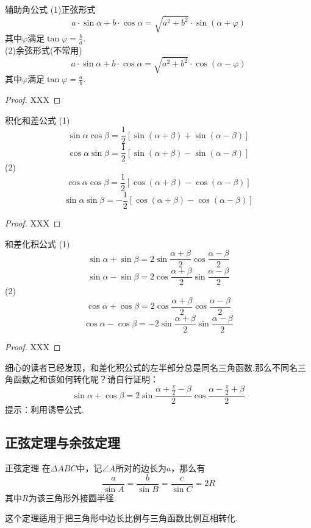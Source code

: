 \documentclass[lang=cn, zihao=5]{elegantbook}
\begin{document}
\begin{proposition}{辅助角公式}
    (1)正弦形式$$a \cdot \sin{\alpha} + b \cdot \cos{\alpha} = \sqrt{a^2+b^2} \cdot \sin{(\alpha + \varphi)}$$
    其中$\varphi$满足$\tan{\varphi}=\frac{b}{a}$.\\
    (2)余弦形式(不常用)$$a \cdot \sin{\alpha} + b \cdot \cos{\alpha} = \sqrt{a^2+b^2} \cdot \cos{(\alpha - \varphi)}$$
    其中$\varphi$满足$\tan{\varphi}=\frac{a}{b}$.
\end{proposition}
\begin{proof}
    XXX
\end{proof}

\begin{proposition}{积化和差公式} %
    (1)$$\sin{\alpha}\cos{\beta}=\frac{1}{2}[\sin{(\alpha+\beta)}+\sin{(\alpha-\beta)}]$$
    $$\cos{\alpha}\sin{\beta}=\frac{1}{2}[\sin{(\alpha+\beta)}-\sin{(\alpha-\beta)}]$$
    (2)$$\cos{\alpha}\cos{\beta}=\frac{1}{2}[\cos{(\alpha+\beta)}-\cos{(\alpha-\beta)}]$$
    $$\sin{\alpha}\sin{\beta}=-\frac{1}{2}[\cos{(\alpha+\beta)}-\cos{(\alpha-\beta)}]$$
\end{proposition}
\begin{proof}
    XXX
\end{proof}

\begin{proposition}{和差化积公式} %
    (1)$$\sin{\alpha}+\sin{\beta}=2\sin{\frac{\alpha+\beta}{2}}\cos{\frac{\alpha-\beta}{2}}$$
    $$\sin{\alpha}-\sin{\beta}=2\cos{\frac{\alpha+\beta}{2}}\sin{\frac{\alpha-\beta}{2}}$$
    (2)$$\cos{\alpha}+\cos{\beta}=2\cos{\frac{\alpha+\beta}{2}}\cos{\frac{\alpha-\beta}{2}}$$
    $$\cos{\alpha}-\cos{\beta}=-2\sin{\frac{\alpha+\beta}{2}}\sin{\frac{\alpha-\beta}{2}}$$
\end{proposition}
\begin{proof}
    XXX
\end{proof}
\begin{remark}
    细心的读者已经发现，和差化积公式的左半部分总是同名三角函数.那么不同名三角函数之和该如何转化呢？请自行证明：$$\sin{\alpha}+\cos{\beta}=2\sin{\frac{\alpha+\frac{\pi}{2}-\beta}{2}}\cos{\frac{\alpha-\frac{\pi}{2}+\beta}{2}}$$
    提示：利用诱导公式.
\end{remark}

\subsection{正弦定理与余弦定理}

\begin{theorem}{正弦定理} %
    在$\Delta ABC$中，记$\angle A$所对的边长为$a$，那么有$$\frac{a}{\sin{A}}=\frac{b}{\sin{B}}=\frac{c}{\sin{C}}=2R$$其中$R$为该三角形外接圆半径.
\end{theorem}
这个定理适用于把三角形中边长比例与三角函数比例互相转化.
\end{document}

